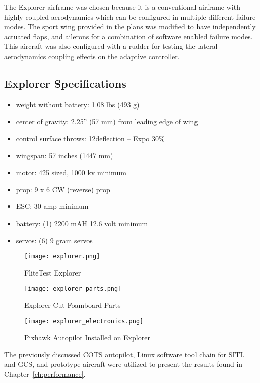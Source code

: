 The Explorer airframe was chosen because it is a conventional airframe with highly coupled aerodynamics which can be configured in multiple different failure modes.  The sport wing provided in the plans was modified to have independently actuated flaps, and ailerons for a combination of software enabled failure modes.  This aircraft was also configured with a rudder for testing the lateral aerodynamics coupling effects on the adaptive controller.  

\subsection{Explorer Specifications}
\begin{itemize}
 \item weight without battery: 1.08 lbs (493 g)
 \item center of gravity: 2.25” (57 mm) from leading edge of wing
 \item control surface throws: 12\degrees  deflection – Expo 30\%
 \item wingspan: 57 inches (1447 mm)
 \item motor: 425 sized, 1000 kv minimum
 \item prop: 9 x 6 CW (reverse) prop
 \item ESC: 30 amp minimum
 \item battery: (1) 2200 mAH 12.6 volt minimum
 \item servos: (6) 9 gram servos 
\end{itemize}

\begin{figure}[!h]
 \centering
  \texttt{[image: explorer.png]}
  \caption{FliteTest Explorer \cite{flitetest}}
  \label{fig:explorer_parts}
\end{figure}

\begin{figure}[!h]
 \centering
  \texttt{[image: explorer\_parts.png]}
  \caption{Explorer Cut Foamboard Parts}
  \label{fig:explorer_parts}
\end{figure}

\begin{figure}[!h]
 \centering
  \texttt{[image: explorer\_electronics.png]}
  \caption{Pixhawk Autopilot Installed on Explorer}
  \label{fig:explorer_electronics}
\end{figure}

The previously discussed \ac{COTS} autopilot, Linux software tool chain for \ac{SITL} and \ac{GCS}, and prototype aircraft were utilized to present the results found in Chapter~\ref{ch:performance}.




